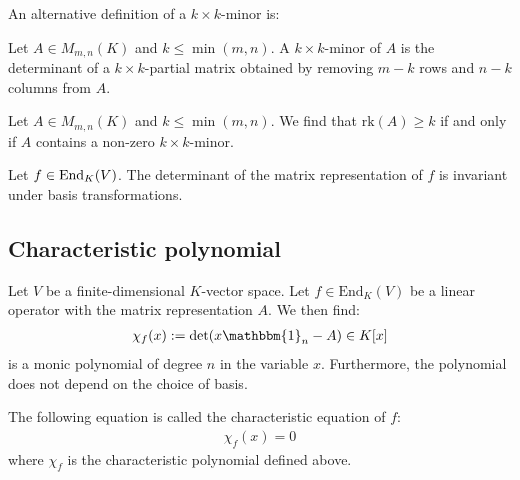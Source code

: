         An alternative definition of a $k\times k$-minor is: 
        \begin{adefinition}[Minor]
		Let $A\in M_{m,n}(K)$ and $k\leq\min(m, n)$. A $k\times k$-minor of $A$ is the determinant of a $k\times k$-partial matrix obtained by removing $m-k$ rows and $n-k$ columns from $A$.
	\end{adefinition}
        \begin{property}
		Let $A\in M_{m,n}(K)$ and $k\leq\min(m, n)$. We find that $\text{rk}(A)\geq k$ if and only if $A$ contains a non-zero $k\times k$-minor.
	\end{property}
        
        \begin{property}
		Let $f\in\textup{End}_K(V)$. The determinant of the matrix representation of $f$ is invariant under basis transformations.
	\end{property}

\subsection{Characteristic polynomial}

    	\begin{definition}\label{linalgebra:characteristic_polynomial}
		Let $V$ be a finite-dimensional $K$-vector space. Let $f\in \text{End}_K(V)$ be a linear operator with the matrix representation $A$. We then find:
		\begin{gather}
                	\chi_f(x) := \det(x\mathbbm{1}_n - A) \in K[x]
		\end{gather}
		is a monic polynomial of degree $n$ in the variable $x$. Furthermore, the polynomial does not depend on the choice of basis.
	\end{definition}
        
        \begin{definition}
		The following equation is called the characteristic equation of $f$:
	        \begin{gather}
            		\label{linalgebra:characteristic_equation}
			\chi_f(x) = 0
		\end{gather}
		where $\chi_f$ is the characteristic polynomial defined above.
	\end{definition}
        
